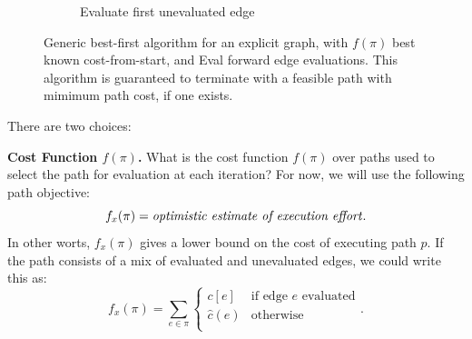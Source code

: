 \begin{figure}
\begin{subfigure}[b]{0.45\textwidth}
\caption{Evaluate first unevaluated edge}
\end{subfigure}%
\caption{Generic best-first algorithm for an explicit graph,
   with $f(\pi)$ best known cost-from-start,
   and {\sc Eval} forward edge evaluations.
   This algorithm is guaranteed to terminate with a feasible path
   with mimimum path cost, if one exists.}
\label{fig:seg-edge-example}
\end{figure}

There are two choices:

\textbf{Cost Function $f(\pi)$.}
What is the cost function $f(\pi)$ over paths used to select the
path for evaluation at each iteration?
For now, we will use the following path objective:
\begin{equation}
   f_x(\pi) = \mbox{\emph{optimistic estimate of execution effort}}.
\end{equation}
In other worts, $f_x(\pi)$ gives a lower bound on the cost of executing
path $p$.
If the path consists of a mix of evaluated and unevaluated edges,
we could write this as:
\begin{equation}
   f_x(\pi) = \sum_{e \in \pi} \left\{
   \begin{array}{cl}
      c[e] & \mbox{if edge } e \mbox{ evaluated}  \\
      \hat{c}(e) & \mbox{otherwise} \\
   \end{array}
   \right.
   .
   \label{eqn:execution-cost-objective}
\end{equation}

